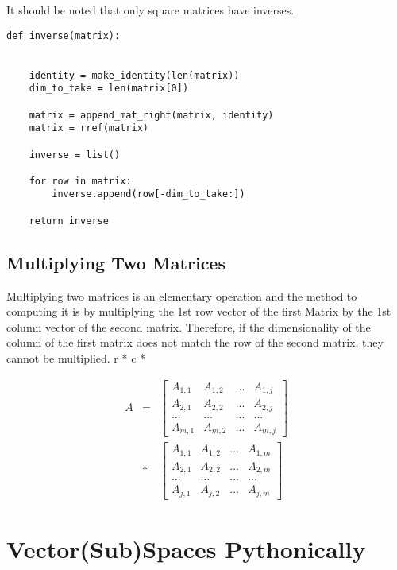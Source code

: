\documentclass[12pt, a4paper]{article}
\begin{document}
It should be noted that only square matrices have inverses. 

\begin{lstlisting}
def inverse(matrix):
    

    identity = make_identity(len(matrix))
    dim_to_take = len(matrix[0])

    matrix = append_mat_right(matrix, identity)
    matrix = rref(matrix)

    inverse = list()

    for row in matrix:
        inverse.append(row[-dim_to_take:])

    return inverse
\end{lstlisting}

\subsection{Multiplying Two Matrices}

Multiplying two matrices is an elementary operation and the method to computing it is by multiplying the 1st row vector of the first Matrix by the 1st column vector of the second matrix. 
Therefore, if the dimensionality of the column of the first matrix does not match the row of the second matrix, they cannot be multiplied.
r * c  * 

\begin{eqnarray*}
    A & = & \begin{bmatrix}
        A_{1,1}  & A_{1,2} & ... & A_{1,j}\\
        A_{2,1} & A_{2,2} & ... & A_{2,j}\\
        ... & ... & ... & ... \\
        A_{m,1}& A_{m,2} & ... & A_{m,j}
    \end{bmatrix} \\     
    & * & \begin{bmatrix}
        A_{1,1}  & A_{1,2} & ... & A_{1,m}\\
        A_{2,1} & A_{2,2} & ... & A_{2,m}\\
        ... & ... & ... & ... \\
        A_{j,1}& A_{j,2} & ... & A_{j,m}
    \end{bmatrix}
\end{eqnarray*}


\section{Vector(Sub)Spaces Pythonically}
\end{document}
